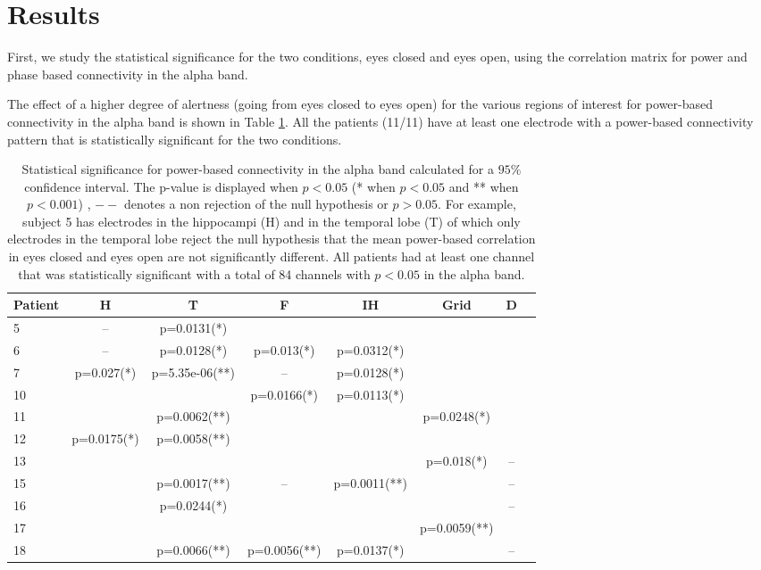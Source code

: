 \documentclass[11pt, onecolumn]{article}
\begin{document}
\section*{Results}

First, we study the statistical significance for the two conditions, eyes closed and eyes open, using the correlation matrix for power and phase based connectivity in the alpha band. 

The effect of a higher degree of alertness (going from eyes closed to eyes open) for the various regions of interest for power-based connectivity in the alpha band is shown in Table \ref{Table:powconnect}. All the patients (11/11) have at least one electrode with a power-based connectivity pattern that is statistically significant for the two conditions.


\begin{table}
\centering
\begin{tabular}{l*{6}{c}r}
Patient & H & T & F & IH & Grid & D  \\
\hline
5 & -- & p=0.0131(*) &  & &  &  \\ %
6 & -- & p=0.0128(*) & p=0.013(*) & p=0.0312(*) &  & \\ %
7 &  p=0.027(*)  &  p=5.35e-06(**)  & -- &  p=0.0128(*) & & \\
10 &  &  &  p=0.0166(*)  &   p=0.0113(*) &  &  \\
11 &  &  p=0.0062(**) &  &  &   p=0.0248(*)\\
12 &  p=0.0175(*) &  p=0.0058(**) &  &  & & \\ %
13 &  &  &  &  &  p=0.018(*) & -- \\%
15 &  &   p=0.0017(**) & -- &  p=0.0011(**) &  & --\\
16 &  &  p=0.0244(*) &  &  &  & -- \\
17 &  &  &  &  &   p=0.0059(**) & \\ %
18 &  &  p=0.0066(**) &  p=0.0056(**) &  p=0.0137(*) &  & --  \\
\end{tabular}
\caption{\label{Table:powconnect} 
Statistical significance for power-based connectivity in the alpha band calculated for a $95\%$ confidence interval. The p-value is displayed when $p<0.05$ (* when $p<0.05$ and ** when $p<0.001$) , $--$ denotes a non rejection of the null hypothesis or $p>0.05$. For example, subject 5 has electrodes in the hippocampi (H) and in the temporal lobe (T) of which only electrodes in the temporal lobe reject the null hypothesis that the mean power-based correlation in eyes closed and eyes open are  not significantly different. All patients had at least one channel that was statistically significant with a total of 84 channels with $p<0.05$ in the alpha band.}
\end{table}
\end{document}
